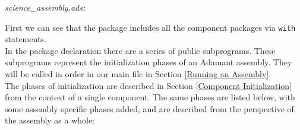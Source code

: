\textit{science\_assembly.ads:}

First we can see that the package includes all the component packages via \texttt{with} statements. \\

In the package declaration there are a series of public subprograms. These subprograms represent the initialization phases of an Adamant assembly. They will be called in order in our main file in Section \ref{Running an Assembly}. \\

The phases of initialization are described in Section \ref{Component Initialization} from the context of a single component. The same phases are listed below, with some assembly specific phases added, and are described from the perspective of the assembly as a whole:

